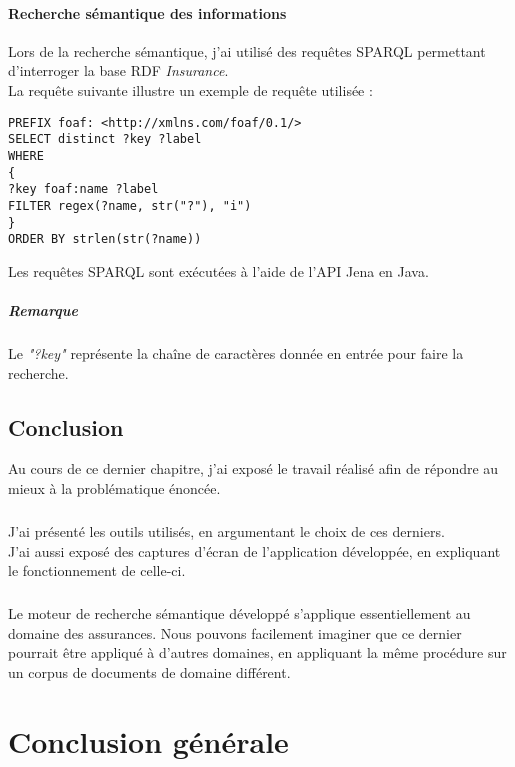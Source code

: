 \documentclass[12pt, a4paper, oneside]{book}
\begin{document}
\subsubsection{Recherche sémantique des informations}
 
 Lors de la recherche sémantique, j'ai utilisé des requêtes SPARQL permettant d'interroger la base RDF \emph{Insurance}.\\
La requête suivante illustre un exemple de requête utilisée :
\begin{verbatim}
PREFIX foaf: <http://xmlns.com/foaf/0.1/>
SELECT distinct ?key ?label
WHERE
{
?key foaf:name ?label
FILTER regex(?name, str("?"), "i")
}
ORDER BY strlen(str(?name))
\end{verbatim}

Les requêtes SPARQL sont exécutées à l'aide de l'API Jena en Java.

\paragraph{Remarque}

Le \emph{"?key"} représente la chaîne de caractères donnée en entrée pour faire la recherche.

\section{Conclusion}

Au cours de ce dernier chapitre, j'ai exposé le travail réalisé afin de répondre au mieux à la problématique énoncée.
\paragraph{}
J'ai présenté les outils utilisés, en argumentant le choix de ces derniers.\\
J'ai aussi exposé des captures d'écran de l'application développée, en expliquant le fonctionnement de celle-ci. 

\paragraph{}
Le moteur de recherche sémantique développé s'applique essentiellement au domaine des assurances.
Nous pouvons facilement imaginer que ce dernier pourrait être appliqué à d'autres domaines, en appliquant la même procédure sur un corpus de documents de domaine différent.
 

\chapter*{Conclusion générale}
\end{document}
